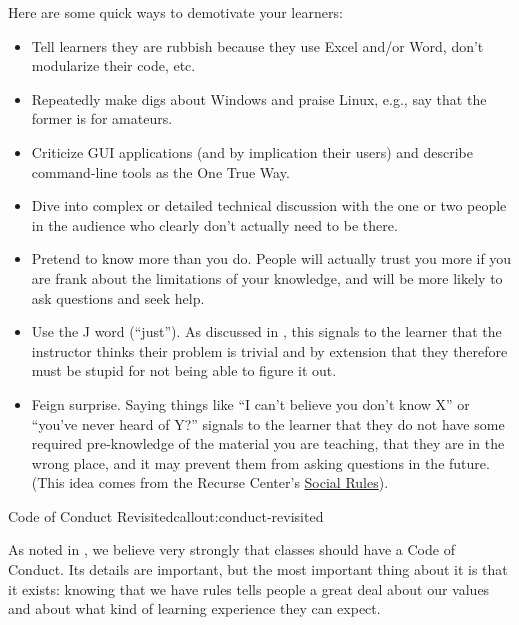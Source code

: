 Here are some quick ways to demotivate your learners:

\begin{itemize}

\item
  Tell learners they are rubbish because they use Excel and/or Word,
  don't modularize their code, etc.

\item
  Repeatedly make digs about Windows and praise Linux, e.g., say that
  the former is for amateurs.

\item
  Criticize GUI applications (and by implication their users) and
  describe command-line tools as the One True Way.

\item
  Dive into complex or detailed technical discussion with the one or
  two people in the audience who clearly don't actually need to be
  there.

\item
  Pretend to know more than you do. People will actually trust you
  more if you are frank about the limitations of your knowledge, and
  will be more likely to ask questions and seek help.

\item
  Use the J word (``just''). As discussed in , this
  signals to the learner that the instructor thinks their problem is
  trivial and by extension that they therefore must be stupid for not
  being able to figure it out.

\item
  Feign surprise. Saying things like ``I can't believe you don't know
  X'' or ``you've never heard of Y?'' signals to the learner that they
  do not have some required pre-knowledge of the material you are
  teaching, that they are in the wrong place, and it may prevent them
  from asking questions in the future. (This idea comes from the
  Recurse Center's
  \href{https://www.recurse.com/manual\#sec-environment}{Social Rules}).

\end{itemize}

\begin{callout}{Code of Conduct Revisited}{callout:conduct-revisited}

As noted in , we believe very strongly that
classes should have a Code of Conduct. Its details are important, but
the most important thing about it is that it exists: knowing that we
have rules tells people a great deal about our values and about what
kind of learning experience they can expect.

\end{callout}

